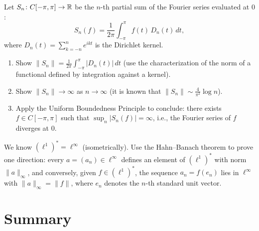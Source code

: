 \documentclass[11pt,a4paper]{article}
\begin{document}
\begin{exercise}
\label{ex:bs-fourier}
Let $S_n \colon C[-\pi, \pi] \to \mathbb{R}$ be the $n$-th partial sum of the
Fourier series evaluated at $0$:
\[
    S_n(f) = \frac{1}{2\pi} \int_{-\pi}^{\pi} f(t)\, D_n(t)\, dt,
\]
where $D_n(t) = \sum_{k=-n}^{n} e^{ikt}$ is the Dirichlet kernel.
\begin{enumerate}[label=(\alph*)]
    \item Show $\|S_n\| = \frac{1}{2\pi} \int_{-\pi}^{\pi} |D_n(t)|\, dt$
          (use the characterization of the norm of a functional defined
          by integration against a kernel).
    \item Show $\|S_n\| \to \infty$ as $n \to \infty$ (it is known that
          $\|S_n\| \sim \frac{4}{\pi^2} \log n$).
    \item Apply the Uniform Boundedness Principle to conclude: there
          exists $f \in C[-\pi, \pi]$ such that
          $\sup_n |S_n(f)| = \infty$, i.e., the Fourier series of $f$
          diverges at $0$.
\end{enumerate}
\end{exercise}

\begin{exercise}
\label{ex:dual-ell1}
We know $(\ell^1)^* = \ell^\infty$ (isometrically). Use the
Hahn--Banach theorem to prove one direction: every
$a = (a_n) \in \ell^\infty$ defines an element of $(\ell^1)^*$ with
norm $\|a\|_\infty$, and conversely, given $f \in (\ell^1)^*$, the
sequence $a_n = f(e_n)$ lies in $\ell^\infty$ with
$\|a\|_\infty = \|f\|$, where $e_n$ denotes the $n$-th standard unit
vector.
\end{exercise}


\section{Summary}
\label{sec:summary}
\end{document}
